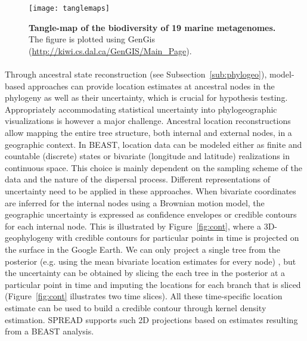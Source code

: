 \begin{figure}[H]
\centering
\texttt{[image: tanglemaps]}
\caption{
{ \footnotesize 
{\bf Tangle-map of the biodiversity of 19 marine metagenomes.} 
The figure is plotted using GenGis (\url{http://kiwi.cs.dal.ca/GenGIS/Main_Page}).
} %
}
\label{fig:tanglemaps}
\end{figure}

\paragraph{}
Through ancestral state reconstruction (see Subsection~\ref{sub:phylogeo}), model-based approaches can provide location estimates at ancestral nodes in the phylogeny as well as their uncertainty, which is crucial for hypothesis testing.
Appropriately accommodating statistical uncertainty into phylogeographic visualizations is however a major challenge.
Ancestral location reconstructions allow mapping the entire tree structure, both internal and external nodes, in a geographic context.
In BEAST, location data can be modeled either as finite and countable (discrete) states or bivariate (longitude and latitude) realizations in continuous space.
This choice is mainly dependent on the sampling scheme of the data and the nature of the dispersal process.
Different representations of uncertainty need to be applied in these approaches.
When bivariate coordinates are inferred for the internal nodes using a Brownian motion model, the geographic uncertainty is expressed as confidence envelopes or credible contours for each internal node.
This is illustrated by Figure~\ref{fig:cont}, where a 3D-geophylogeny with credible contours for particular points in time is projected on the surface in the Google Earth.
We can only project a single tree from the posterior (e.g. using the mean bivariate location estimates for every node) , but the uncertainty can be obtained by slicing the each tree in the posterior at a particular point in time and imputing the locations for each branch that is sliced (Figure~\ref{fig:cont} illustrates two time slices).
All these time-specific location estimate can be used to build a credible contour through kernel density estimation.
SPREAD supports such 2D projections based on estimates resulting from a BEAST analysis.

